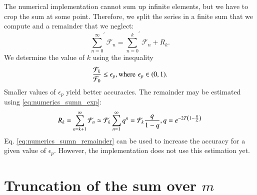 The numerical implementation cannot sum up infinite elements, but we have to
crop the sum at some point. Therefore, we split the series in a
finite sum that we compute and a remainder that we neglect:
\begin{equation}
{\sum_{n=0}^\infty}^\prime \mathcal{F}_n = {\sum_{n=0}^k}^\prime \mathcal{F}_n + R_k.
\end{equation}
We determine the value of $k$ using the inequality
\begin{equation}
\frac{\mathcal{F}_k}{\mathcal{F}_0} \le \epsilon_p, \\ \text{where} \, \, \epsilon_p \in (0,1).
\end{equation}
Smaller values of $\epsilon_p$ yield better accuracies.
The remainder may be estimated using \eqref{eq:numerics_sumn_exp}:
\begin{equation}
\label{eq:numerics_sumn_remainder}
R_k = \sum_{n=k+1}^\infty \mathcal{F}_n \simeq 
\mathcal{F}_k \sum_{n=1}^\infty q^n = \mathcal{F}_k \frac{q}{1-q}, \\ q = e^{-2T\left(1-\frac{R}{\mathcal{L}}\right)}
\end{equation}
Eq. \eqref{eq:numerics_sumn_remainder} can be used to increase the accuracy for
a given value of $\epsilon_p$. However, the implementation does not use this
estimation yet.


\section{Truncation of the sum over $m$}

